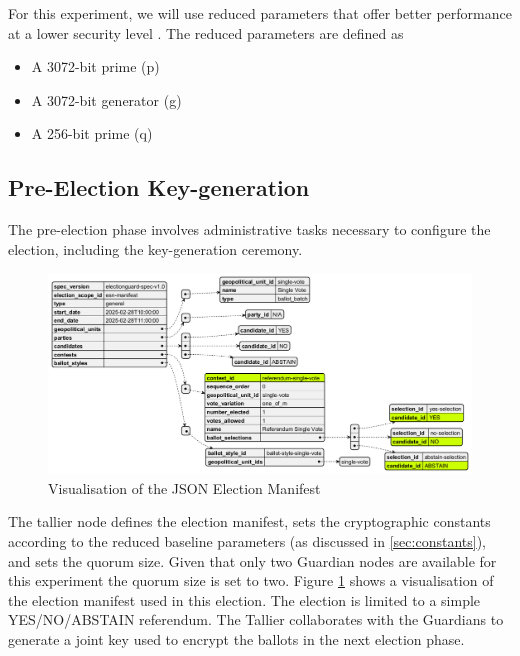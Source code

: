 For this experiment, we will use reduced parameters that offer better performance at a lower security level \cite[23]{eg-spec}. The reduced parameters are defined as  
\begin{itemize}
    \item A 3072-bit prime (p) \cite[36]{eg-spec}
    \item A 3072-bit generator (g) \cite[36-37]{eg-spec}
    \item A 256-bit prime (q) \cite[36]{eg-spec}
\end{itemize}

\subsection{Pre-Election Key-generation}
The pre-election phase involves administrative tasks necessary to configure the election, including the key-generation ceremony.

\begin{figure}
    \centering
    \includegraphics[width=\textwidth]{abbildungen/Diagramme/manifest.png}
    \caption{Visualisation of the JSON Election Manifest}
    \label{Fig:manifest}
\end{figure}

The tallier node defines the election manifest, sets the cryptographic constants according to the reduced baseline parameters (as discussed in \ref{sec:constants}), and sets the quorum size. Given that only two Guardian nodes are available for this experiment the quorum size is set to two. Figure \ref{Fig:manifest} shows a visualisation of the election manifest used in this election. The election is limited to a simple YES/NO/ABSTAIN referendum. The Tallier collaborates with the Guardians to generate a joint key used to encrypt the ballots in the next election phase.

